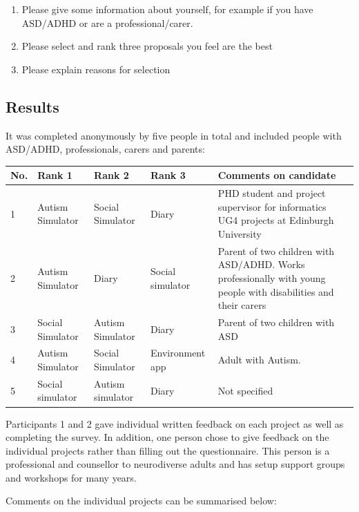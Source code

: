 \documentclass[11pt]{report}
\begin{document}
\begin{enumerate}
\item Please give some information about yourself, for example if you have ASD/ADHD or are a professional/carer.
\item Please select and rank three proposals you feel are the best
\item Please explain reasons for selection
\end{enumerate}

\subsection{Results}
It was completed anonymously by five people in total and included people with ASD/ADHD, professionals, carers and parents:

\begin{table}[H]
    \begin{tabular}{| p{2cm} | p{3cm} | p{3cm}| p{3cm} | p{4cm} |}
    \hline
    No. & Rank 1 & Rank 2 & Rank 3 & Comments on candidate \\ \hline
    1 & Autism Simulator & Social Simulator & Diary & PHD student and project supervisor for informatics UG4 projects at Edinburgh University\\ \hline
    2 & Autism Simulator & Diary & Social simulator & Parent of two children with ASD/ADHD. Works professionally with young people with disabilities and their carers\\ \hline
    3 & Social Simulator & Autism Simulator & Diary & Parent of two children with ASD\\ \hline
    4 & Autism Simulator & Social Simulator & Environment app & Adult with Autism. \\ \hline
    5 & Social simulator & Autism simulator & Diary & Not specified \\ \hline
    \end{tabular}
\end{table}

Participants 1 and 2 gave individual written feedback on each project as well as completing the survey. In addition, one person chose to give feedback on the individual projects rather than filling out the questionnaire. This person is a professional and counsellor to neurodiverse adults and has setup support groups and workshops for many years. 

Comments on the individual projects can be summarised below:
\end{document}
